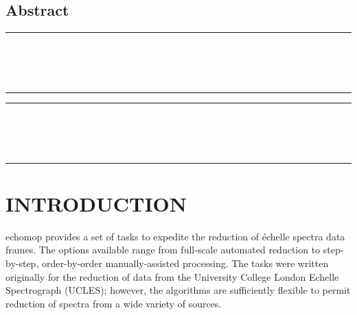 \begin{htmlonly}
  \section{Abstract}
\end{htmlonly}

\stardocabstract
 \begin{latexonly}
   \newpage
   \markright{\stardocname}
   \null\vspace{5mm}
   \begin {center}
     \rule{80mm}{0.5mm} \\ [1ex]
     {\Large\bf   \stardoctitle \\ [2.5ex]
      \normalsize \stardocversion} \\ [2ex]
    \rule{80mm}{0.5mm}
   \end{center}
   \setlength{\parskip}{0mm}
   \latexonlytoc
   \setlength{\parskip}{\medskipamount}
 \end{latexonly}
\newpage
\renewcommand{\thepage}{\arabic{page}}
\setcounter{page}{1}
\begin{latexonly}
  \begin {center}
     \rule{80mm}{0.5mm} \\ [1ex]
     {\Large\bf   \stardoctitle \\ [2.5ex]
      \normalsize \stardocversion} \\ [2ex]
    \rule{80mm}{0.5mm}
  \end{center}
\end{latexonly}


\section{INTRODUCTION}

{\sc echomop} provides a set of tasks to expedite the reduction of \'{e}chelle
spectra data frames.  The options available range from full-scale
automated reduction to step-by-step, order-by-order manually-assisted
processing.  The tasks were written originally for the reduction of
data from the University College London Echelle Spectrograph (UCLES);
however, the algorithms are sufficiently flexible to permit reduction of
spectra from a wide variety of sources.


